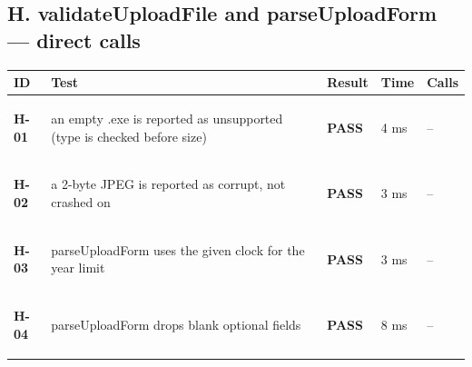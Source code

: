 \documentclass[10pt,a4paper]{article}
\begin{document}
\subsection*{H. validateUploadFile and parseUploadForm — direct calls}
\begin{longtable}{@{}P{1.2cm}P{9.2cm}P{1.2cm}P{1.3cm}P{2.4cm}@{}}
\toprule \textbf{ID} & \textbf{Test} & \textbf{Result} & \textbf{Time} & \textbf{Calls} \\ \midrule \endhead
\hypertarget{test-H-01}{\textbf{H-01}} & an empty .exe is reported as unsupported (type is checked before size) & \textcolor{passgreen}{\textbf{PASS}} & 4 ms & -- \\
\hypertarget{test-H-02}{\textbf{H-02}} & a 2-byte JPEG is reported as corrupt, not crashed on & \textcolor{passgreen}{\textbf{PASS}} & 3 ms & -- \\
\hypertarget{test-H-03}{\textbf{H-03}} & parseUploadForm uses the given clock for the year limit & \textcolor{passgreen}{\textbf{PASS}} & 3 ms & -- \\
\hypertarget{test-H-04}{\textbf{H-04}} & parseUploadForm drops blank optional fields & \textcolor{passgreen}{\textbf{PASS}} & 8 ms & -- \\
\bottomrule
\end{longtable}
\end{document}
